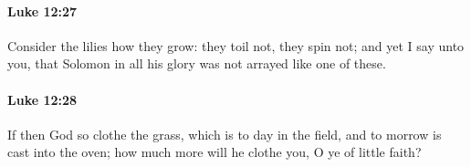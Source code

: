 		\paragraph{Luke 12:27} %
			\label{LUKE-12-27}

			Consider the lilies how they grow: they toil not, they spin not; and yet I say unto you, that Solomon in all his glory was not arrayed like one of these.

			\begin{framed}
			\scriptsize
				\begin{compactdesc}
					\item[SBLG] 
				\end{compactdesc}
			\end{framed}

		\paragraph{Luke 12:28} %
			\label{LUKE-12-28}

			If then God so clothe the grass, which is to day in the field, and to morrow is cast into the oven; how much more will he clothe you, O ye of little faith?

